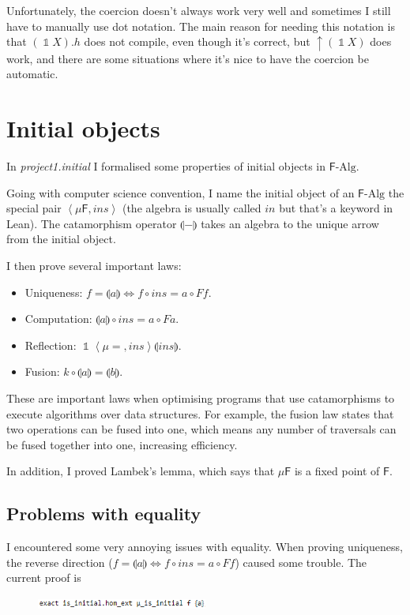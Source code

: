 \documentclass[a4paper, twoside, 11pt]{article}
\theoremstyle{definition}
\theoremstyle{plain}
\theoremstyle{remark}
\newcommand{\alg}[1]{\mathsf{#1}\text{-Alg}}
\newcommand{\fun}[1]{\mathsf{#1}}
\newcommand{\fix}[1]{\mu\fun{#1}}
\newcommand{\initial}[1]{\left<\fix{#1},ins\right>}
\newcommand{\cata}[1]{\llparenthesis #1 \rrparenthesis}
\DeclareMathOperator{\id}{\mathbb{1}}
\begin{document}
Unfortunately, the coercion doesn't always work very well and sometimes I still have to manually use dot notation. The main reason for needing this notation is that $(\id X).h$ does not compile, even though it's correct, but $\uparrow (\id X)$ does work, and there are some situations where it's nice to have the coercion be automatic.


\section{Initial objects}

In \emph{project1.initial} I formalised some properties of initial objects in $\alg{F}$.

Going with computer science convention, I name the initial object of an $\alg{F}$ the special pair $\initial{F}$ (the algebra is usually called $in$ but that's a keyword in Lean). The catamorphism operator $\cata{-}$ takes an algebra to the unique arrow from the initial object.

I then prove several important laws:
\begin{itemize}
    \item Uniqueness: $f = \cata{a} \iff f \circ ins = a \circ F f$.
    \item Computation: $\cata{a} \circ ins = a \circ F a$.
    \item Reflection: $\id \initial = \cata{ins}$.
    \item Fusion: $k \circ \cata{a} = \cata{b}$.
\end{itemize}

These are important laws when optimising programs that use catamorphisms to execute algorithms over data structures. For example, the fusion law states that two operations can be fused into one, which means any number of traversals can be fused together into one, increasing efficiency.

In addition, I proved Lambek's lemma, which says that $\fix{F}$ is a fixed point of $\fun{F}$.

\subsection*{Problems with equality}

I encountered some very annoying issues with equality. When proving uniqueness, the reverse direction ($f = \cata{a} \iff f \circ ins = a \circ F f$) caused some trouble. The current proof is

\begin{figure}[htpb]
    \includegraphics[width=0.5\textwidth]{pic1.png}
\end{figure}
\end{document}
